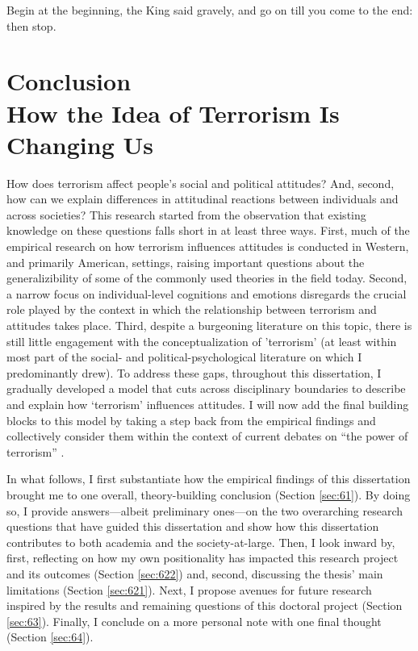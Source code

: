 \begin{savequote}[9cm]
Begin at the beginning, the King said gravely, and go on till you come to the end: then stop.
\end{savequote}


\chapter[Conclusion: How the Idea of Terrorism Is Changing Us]{Conclusion \\ How the Idea of Terrorism Is Changing Us}
\label{chap:chap6}


\lettrine[loversize=-0.2,lines=1]{H}{}ow does terrorism affect people's social and political attitudes? And, second, how can we explain differences in attitudinal reactions between individuals and across societies? This research started from the observation that existing knowledge on these questions falls short in at least three ways. First, much of the empirical research on how terrorism influences attitudes is conducted in Western, and primarily American, settings, raising important questions about the generalizibility of some of the commonly used theories in the field today. Second, a narrow focus on individual-level cognitions and emotions disregards the crucial role played by the context in which the relationship between terrorism and attitudes takes place. Third, despite a burgeoning literature on this topic, there is still little engagement with the conceptualization of 'terrorism' (at least within most part of the social- and political-psychological literature on which I predominantly drew). To address these gaps, throughout this dissertation, I gradually developed a model that cuts across disciplinary boundaries to describe and explain how `terrorism' influences attitudes. I will now add the final building blocks to this model by taking a step back from the empirical findings and collectively consider them within the context of current debates on ``the power of terrorism'' \citep{Diplomat2016}. 


In what follows, I first substantiate how the empirical findings of this dissertation brought me to one overall, theory-building conclusion (Section \ref{sec:61}). By doing so, I provide answers---albeit preliminary ones---on the two overarching research questions that have guided this dissertation and show how this dissertation contributes to both academia and the society-at-large. Then, I look inward by, first, reflecting on how my own positionality has impacted this research project and its outcomes (Section \ref{sec:622}) and, second, discussing the thesis' main limitations (Section \ref{sec:621}). Next, I propose avenues for future research inspired by the results and remaining questions of this doctoral project (Section \ref{sec:63}). Finally, I conclude on a more personal note with one final thought (Section \ref{sec:64}).



